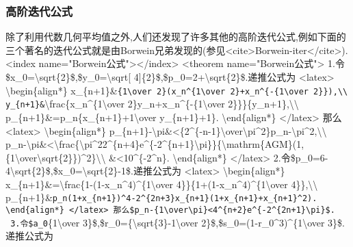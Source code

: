 \documentclass[
]{article}
\begin{document}
\hypertarget{ux9ad8ux9636ux8fedux4ee3ux516cux5f0f}{%
\subsubsection{高阶迭代公式}\label{ux9ad8ux9636ux8fedux4ee3ux516cux5f0f}}

除了利用代数几何平均值之外,人们还发现了许多其他的高阶迭代公式,例如下面的三个著名的迭代公式就是由Borwein兄弟发现的(参见\textless cite\textgreater Borwein-iter\textless/cite\textgreater).
\textless index
name="Borwein公式"\textgreater\textless/index\textgreater{}
\textless theorem name="Borwein公式"\textgreater{}
1.令\$x\_0=\textbackslash sqrt\{2\}\$,\$y\_0=\textbackslash sqrt{[}
4{]}\{2\}\$,\$p\_0=2+\textbackslash sqrt\{2\}\$.递推公式为
\textless latex\textgreater{} \textbackslash begin\{align*\}
x\_\{n+1\}\&\texttt{\{1\textbackslash{}over\ 2\}(x\_n\^{}\{1\textbackslash{}over\ 2\}+x\_n\^{}\{-\{1\textbackslash{}over\ 2\}\}),\textbackslash{}\textbackslash{}
y\_\{n+1\}\&}\textbackslash frac\{x\_n\^{}\{1\textbackslash over
2\}y\_n+x\_n\^{}\{-\{1\textbackslash over
2\}\}\}\{y\_n+1\},\textbackslash\textbackslash{}
p\_\{n+1\}\&=p\_n\{x\_\{n+1\}+1\textbackslash over y\_\{n+1\}+1\}.
\textbackslash end\{align*\} \textless/latex\textgreater{} 那么
\textless latex\textgreater{} \textbackslash begin\{align*\}
\textbar p\_\{n+1\}-\textbackslash pi\textbar\&\textless\{2\^{}\{-n-1\}\textbackslash over\textbackslash pi\^{}2\}\textbar p\_n-\textbackslash pi\textbar\^{}2,\textbackslash\textbackslash{}
\textbar p\_n-\textbackslash pi\textbar\&\textless\textbackslash frac\{\textbackslash pi\^{}22\^{}\{n+4\}e\^{}\{-2\^{}\{n+1\}\textbackslash pi\}\}\{\textbackslash mathrm\{AGM\}(1,\{1\textbackslash over\textbackslash sqrt\{2\}\})\^{}2\}\textbackslash\textbackslash{}
\&\textless10\^{}\{-2\^{}n\}. \textbackslash end\{align*\}
\textless/latex\textgreater{}
2.令\$p\_0=6-4\textbackslash sqrt\{2\}\$,\$x\_0=\textbackslash sqrt\{2\}-1\$.递推公式为
\textless latex\textgreater{} \textbackslash begin\{align*\}
x\_\{n+1\}\&=\textbackslash frac\{1-(1-x\_n\^{}4)\^{}\{1\textbackslash over
4\}\}\{1+(1-x\_n\^{}4)\^{}\{1\textbackslash over
4\}\},\textbackslash\textbackslash{}
p\_\{n+1\}\&\texttt{p\_n(1+x\_\{n+1\})\^{}4-2\^{}\{2n+3\}x\_\{n+1\}(1+x\_\{n+1\}+x\_\{n+1\}\^{}2).
\textbackslash{}end\{align*\}
\textless{}/latex\textgreater{}
那么\$\textbar{}p\_n-\{1\textbackslash{}over\textbackslash{}pi\}\textbar{}\textless{}4\^{}\{n+2\}e\^{}\{-2\^{}\{2n+1\}\textbackslash{}pi\}\$.
\ 3.令\$a\_0}\{1\textbackslash over
3\}\$,\$r\_0=\{\textbackslash sqrt\{3\}-1\textbackslash over
2\}\$,\$s\_0=(1-r\_0\^{}3)\^{}\{1\textbackslash over 3\}\$.递推公式为
\end{document}
